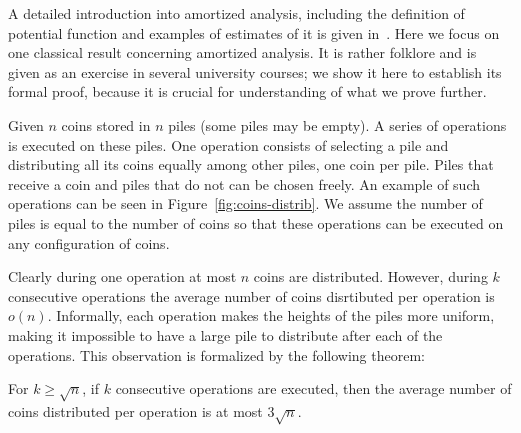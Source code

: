 A detailed introduction into amortized analysis, including
the definition of potential function and examples of estimates of it
is given in~\cite{cormen-iii}.
Here we focus on one classical result concerning amortized analysis.
It is rather folklore and is given as an exercise in several university courses;
we show it here to establish its formal proof, because it is crucial for
understanding of what we prove further.

Given $n$ coins stored in $n$ piles (some piles may be empty). A series of operations
is executed on these piles. One operation consists of selecting a pile and distributing
all its coins equally among other piles, one coin per pile. Piles that receive a coin
and piles that do not can be chosen freely. An example of such operations can be
seen in Figure~\ref{fig:coins-distrib}. We assume the number of piles is equal
to the number of coins so that these operations can be executed
on any configuration of coins.

Clearly during one operation at most $n$ coins are distributed. However, during $k$ consecutive operations the average number of coins disrtibuted per operation is $o(n)$. Informally, each operation makes the heights of the piles more uniform, making it impossible to have a large pile to distribute after each of the operations. This observation is formalized by the following theorem:

\begin{theorem} \label{thm:coins}
	For $k \ge \sqrt{n}$, if $k$ consecutive operations are executed, then the average number of coins distributed per operation is at most $3\sqrt{n}$.
\end{theorem}

